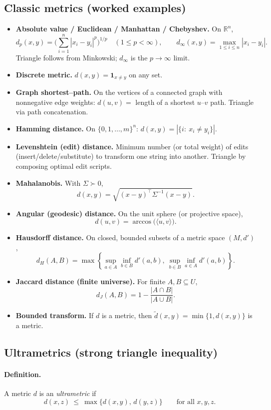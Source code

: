 \documentclass[12pt,a4paper]{article}
\begin{document}
\subsection*{Classic metrics (worked examples)}
\begin{itemize}
\item \textbf{Absolute value / Euclidean / Manhattan / Chebyshev.}
On $\mathbb{R}^n$,
\[
d_p(x,y)=\Big(\sum_{i=1}^n |x_i-y_i|^p\Big)^{1/p}\quad (1\le p<\infty),\qquad
d_\infty(x,y)=\max_{1\le i\le n}|x_i-y_i|.
\]
Triangle follows from Minkowski; $d_\infty$ is the $p\to\infty$ limit.
\item \textbf{Discrete metric.} $d(x,y)=\mathbf 1_{x\ne y}$ on any set.
\item \textbf{Graph shortest--path.} On the vertices of a connected graph with nonnegative edge weights: $d(u,v)=$ length of a shortest $u$--$v$ path. Triangle via path concatenation.
\item \textbf{Hamming distance.} On $\{0,1,\dots,m\}^n$: $d(x,y)=|\{i:\ x_i\ne y_i\}|$.
\item \textbf{Levenshtein (edit) distance.} Minimum number (or total weight) of edits (insert/delete/substitute) to transform one string into another. Triangle by composing optimal edit scripts.
\item \textbf{Mahalanobis.} With $\Sigma\succ0$,
\[
d(x,y)=\sqrt{(x-y)^\top \Sigma^{-1}(x-y)}.
\]
\item \textbf{Angular (geodesic) distance.} On the unit sphere (or projective space),
\[
d(u,v)=\arccos\big(\langle u,v\rangle\big).
\]
\item \textbf{Hausdorff distance.} On closed, bounded subsets of a metric space $(M,d')$,
\[
d_H(A,B)=\max\!\left\{\sup_{a\in A}\inf_{b\in B} d'(a,b),\ \sup_{b\in B}\inf_{a\in A} d'(a,b)\right\}.
\]
\item \textbf{Jaccard distance (finite universe).} For finite $A,B\subseteq U$,
\[
d_J(A,B)=1-\frac{|A\cap B|}{|A\cup B|}.
\]
\item \textbf{Bounded transform.} If $d$ is a metric, then $\tilde d(x,y)=\min\{1,d(x,y)\}$ is a metric.
\end{itemize}

\subsection*{Ultrametrics (strong triangle inequality)}
\paragraph{Definition.} A metric $d$ is an \emph{ultrametric} if
\[
d(x,z)\ \le\ \max\{d(x,y),\,d(y,z)\}\qquad\text{for all }x,y,z.
\]
\end{document}
